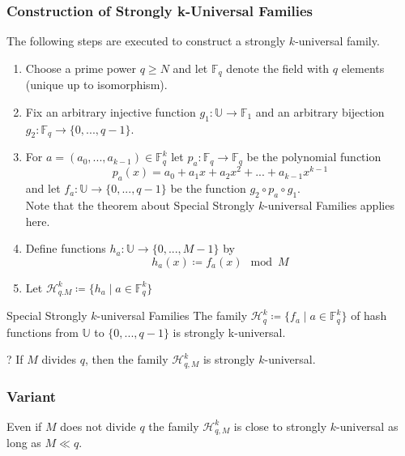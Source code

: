 \documentclass{panikzettel}
\begin{document}
\subsubsection{Construction of Strongly k-Universal Families}
The following steps are executed to construct a strongly $k$-universal family.
\begin{enumerate}
\item Choose a prime power $q\geq N$ and let $\mathbb{F}_q$ denote the field with $q$ elements (unique up to isomorphism).
\item Fix an arbitrary injective function $g_1:\mathbb{U}\to\mathbb{F}_1$ and an arbitrary bijection $g_2:\mathbb{F}_q\to \{0,...,q-1 \}$.
\item For $a=(a_0,...,a_{k-1})\in\mathbb{F}_q^k$ let $p_a:\mathbb{F}_q\to \mathbb{F}_q$ be the polynomial function
\[
p_a(x)=a_0+a_1x+a_2x^2+...+a_{k-1}x^{k-1}
\]
and let $f_a:\mathbb{U}\to \{0,...,q-1 \}$ be the function $g_2\circ p_a\circ g_1$.\\
Note that the theorem about Special Strongly $k$-universal Families applies here.
\item Define functions $h_a:\mathbb{U}\to \{0,...,M-1\}$ by
\[
h_a(x)\coloneqq f_a(x) \mod M
\]
\item Let $\mathcal{H}_{q.M}^k\coloneqq \{h_a\mid a\in \mathbb{F}_q^k \}$
\end{enumerate}

\begin{halfboxl}
\vspace{-\baselineskip}
	\begin{theo}{Special Strongly $k$-universal Families}
	The family $\mathcal{H}_q^k\coloneqq \{f_a\mid a\in \mathbb{F}_q^k \}$ of hash functions from $\mathbb{U}$ to $\{0,...,q-1 \}$ is strongly k-universal.
	\end{theo}
\end{halfboxl}
\begin{halfboxr}
\vspace{-\baselineskip}
	\begin{theo}{?}
	If $M$ divides $q$, then the family $\mathcal{H}_{q,M}^k$ is strongly $k$-universal.
	\end{theo}
\end{halfboxr}

\subsubsection{Variant}
Even if $M$ does not divide $q$ the family $\mathcal{H}_{q,M}^k$ is close to strongly $k$-universal as long as $M\ll q$.
\end{document}
